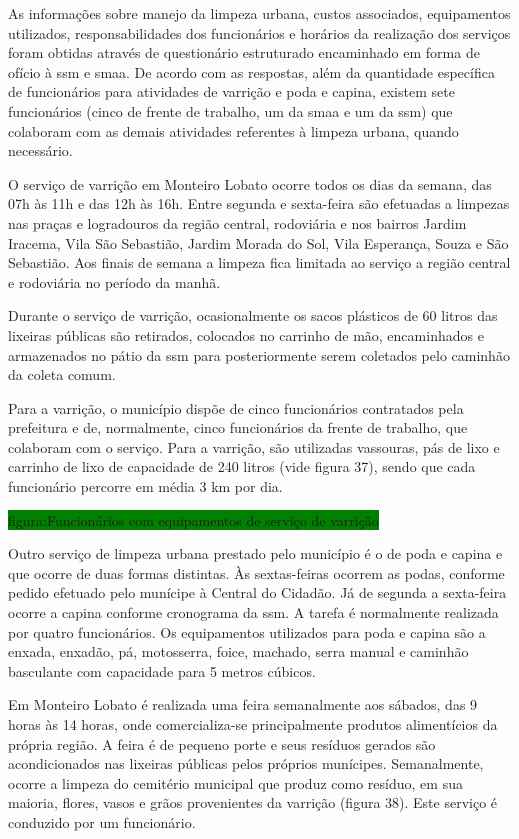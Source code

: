 	As informações sobre manejo da limpeza urbana, custos associados, equipamentos utilizados, responsabilidades dos funcionários e horários da realização dos serviços foram obtidas através de questionário estruturado encaminhado em forma de ofício à \gls{ssm} e \gls{smaa}. De acordo com as respostas, além da quantidade específica de funcionários para atividades de varrição e poda e capina, existem sete funcionários (cinco de frente de trabalho, um da \gls{smaa} e um da \gls{ssm}) que colaboram com as demais atividades referentes à limpeza urbana, quando necessário.
	
	O serviço de varrição em Monteiro Lobato ocorre todos os dias da semana, das 07h às 11h e das 12h às 16h. Entre segunda e sexta-feira são efetuadas a limpezas nas praças e logradouros da região central, rodoviária e nos bairros Jardim Iracema, Vila São Sebastião, Jardim Morada do Sol, Vila Esperança, Souza e São Sebastião. Aos finais de semana a limpeza fica limitada ao serviço a região central e rodoviária no período da manhã.
	
	Durante o serviço de varrição, ocasionalmente os sacos plásticos de 60 litros das lixeiras públicas são retirados, colocados no carrinho de mão, encaminhados e armazenados no pátio da \gls{ssm} para posteriormente serem coletados pelo caminhão da coleta comum.
	
	Para a varrição, o município dispõe de cinco funcionários contratados pela prefeitura e de, normalmente, cinco funcionários da frente de trabalho, que colaboram com o serviço. Para a varrição, são utilizadas vassouras, pás de lixo e carrinho de lixo de capacidade de 240 litros (vide figura 37), sendo que cada funcionário percorre em média 3 km por dia.
	
	\colorbox{green}{figura:Funcionários com equipamentos de serviço de varrição}
	
	Outro serviço de limpeza urbana prestado pelo município é o de poda e capina e que ocorre de duas formas distintas. Às sextas-feiras ocorrem as podas, conforme pedido efetuado pelo munícipe à Central do Cidadão. Já de segunda a sexta-feira ocorre a capina conforme cronograma da \gls{ssm}. A tarefa é normalmente realizada por quatro funcionários. Os equipamentos utilizados para poda e capina são a enxada, enxadão, pá, motosserra, foice, machado, serra manual e caminhão basculante com capacidade para 5 metros cúbicos.
	
	Em Monteiro Lobato é realizada uma feira semanalmente aos sábados, das 9 horas às 14 horas, onde comercializa-se principalmente produtos alimentícios da própria região. A feira é de pequeno porte e seus resíduos gerados são acondicionados nas lixeiras públicas pelos próprios munícipes. Semanalmente, ocorre a limpeza do cemitério municipal que produz como resíduo, em sua maioria, flores, vasos e grãos provenientes da varrição (figura 38). Este serviço é conduzido por um funcionário.
	
